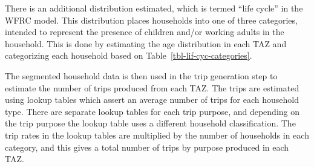 \documentclass[fancy, twoside, mastersfancy, ms]{byuthesis}
\begin{document}
\begin{table}

\caption{\label{tbl-income-groups}Income Groups in the WFRC Model}


\end{table}%

There is an additional distribution estimated, which is termed ``life
cycle'' in the WFRC model. This distribution places households into one
of three categories, intended to represent the presence of children
and/or working adults in the household. This is done by estimating the
age distribution in each TAZ and categorizing each household based on
Table~\ref{tbl-lif-cyc-categories}.

\begin{table}

\caption{\label{tbl-lif-cyc-categories}Life Cycle Categories in the WFRC
Model}


\end{table}%

The segmented household data is then used in the trip generation step to
estimate the number of trips produced from each TAZ. The trips are
estimated using lookup tables which assert an average number of trips
for each household type. There are separate lookup tables for each trip
purpose, and depending on the trip purpose the lookup table uses a
different household classification. The trip rates in the lookup tables
are multiplied by the number of households in each category, and this
gives a total number of trips by purpose produced in each TAZ.
\end{document}
